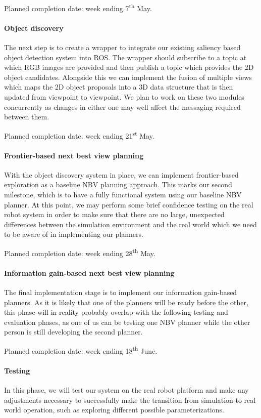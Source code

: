 \documentclass[a4paper,11pt,english]{article}
\begin{document}
Planned completion date: week ending 7\textsuperscript{th} May.

\paragraph{Object discovery}
The next step is to create a wrapper to integrate our existing saliency based object detection system into ROS.
The wrapper should subscribe to a topic at which RGB images are provided and then publish a topic which provides the 2D object candidates.
Alongside this we can implement the fusion of multiple views which maps the 2D object proposals into a 3D data structure that is then updated from viewpoint to viewpoint.
We plan to work on these two modules concurrently as changes in either one may well affect the messaging required between them.

Planned completion date: week ending 21\textsuperscript{st} May.

\paragraph{Frontier-based next best view planning}
With the object discovery system in place, we can implement frontier-based exploration as a baseline NBV planning approach.
This marks our second milestone, which is to have a fully functional system using our baseline NBV planner.
At this point, we may perform some brief confidence testing on the real robot system in order to make sure that there are no large, unexpected differences between the simulation environment and the real world which we need to be aware of in implementing our planners.

Planned completion date: week ending 28\textsuperscript{th} May.

\paragraph{Information gain-based next best view planning}
The final implementation stage is to implement our information gain-based planners.
As it is likely that one of the planners will be ready before the other, this phase will in reality probably overlap with the following testing and evaluation phases, as one of us can be testing one NBV planner while the other person is still developing the second planner.

Planned completion date: week ending 18\textsuperscript{th} June.

\paragraph{Testing}
In this phase, we will test our system on the real robot platform and make any adjustments necessary to successfully make the transition from simulation to real world operation, such as exploring different possible parameterizations.
\end{document}
